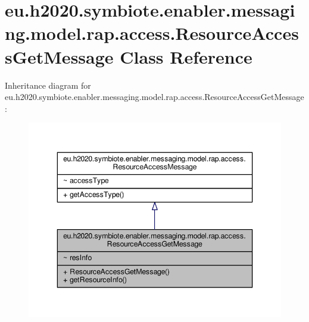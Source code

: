 \hypertarget{classeu_1_1h2020_1_1symbiote_1_1enabler_1_1messaging_1_1model_1_1rap_1_1access_1_1ResourceAccessGetMessage}{}\section{eu.\+h2020.\+symbiote.\+enabler.\+messaging.\+model.\+rap.\+access.\+Resource\+Access\+Get\+Message Class Reference}
\label{classeu_1_1h2020_1_1symbiote_1_1enabler_1_1messaging_1_1model_1_1rap_1_1access_1_1ResourceAccessGetMessage}


Inheritance diagram for eu.\+h2020.\+symbiote.\+enabler.\+messaging.\+model.\+rap.\+access.\+Resource\+Access\+Get\+Message\+:
\nopagebreak
\begin{figure}[H]
\begin{center}
\leavevmode
\includegraphics[width=346pt]{classeu_1_1h2020_1_1symbiote_1_1enabler_1_1messaging_1_1model_1_1rap_1_1access_1_1ResourceAccessGetMessage__inherit__graph}
\end{center}
\end{figure}


